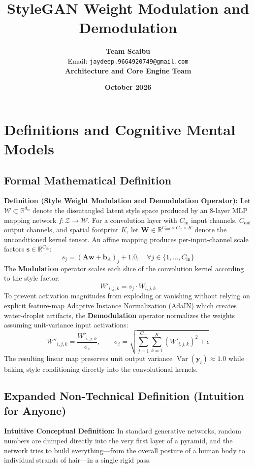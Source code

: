 \documentclass[11pt,a4paper]{article}
\title{\textbf{StyleGAN Weight Modulation and Demodulation}}
\author{\textbf{Team Scaibu} \\ \small Email: \texttt{jaydeep.9664920749@gmail.com} \\ \small \textbf{Architecture and Core Engine Team}}
\date{\textbf{October 2026}}
\theoremstyle{definition}
\begin{document}
\maketitle

\section{Definitions and Cognitive Mental Models}

\subsection{Formal Mathematical Definition}
\textbf{Definition (Style Weight Modulation and Demodulation Operator):}
Let $\mathcal{W} \subset \mathbb{R}^{d_w}$ denote the disentangled latent style space produced by an 8-layer MLP mapping network $f: \mathcal{Z} \to \mathcal{W}$. For a convolution layer with $C_{\text{in}}$ input channels, $C_{\text{out}}$ output channels, and spatial footprint $K$, let $\mathbf{W} \in \mathbb{R}^{C_{\text{out}} \times C_{\text{in}} \times K}$ denote the unconditioned kernel tensor. An affine mapping produces per-input-channel scale factors $\mathbf{s} \in \mathbb{R}^{C_{\text{in}}}$:
{\boldmath
\begin{equation}
s_j = \left( \mathbf{A} \mathbf{w} + \mathbf{b}_A \right)_j + 1.0, \quad \forall j \in \{1, \dots, C_{\text{in}}\}
\end{equation}
}
The \textbf{Modulation} operator scales each slice of the convolution kernel according to the style factor:
{\boldmath
\begin{equation}
W'_{i, j, k} = s_j \cdot W_{i, j, k}
\end{equation}
}
To prevent activation magnitudes from exploding or vanishing without relying on explicit feature-map Adaptive Instance Normalization (AdaIN) which creates water-droplet artifacts, the \textbf{Demodulation} operator normalizes the weights assuming unit-variance input activations:
{\boldmath
\begin{equation}
W''_{i, j, k} = \frac{W'_{i, j, k}}{\sigma_i}, \qquad \sigma_i = \sqrt{\sum_{j=1}^{C_{\text{in}}} \sum_{k=1}^K (W'_{i, j, k})^2 + \epsilon}
\end{equation}
}
The resulting linear map preserves unit output variance $\operatorname{Var}(\mathbf{y}_i) \approx 1.0$ while baking style conditioning directly into the convolutional kernels.

\subsection{Expanded Non-Technical Definition (Intuition for Anyone)}
\textbf{Intuitive Conceptual Definition:}
In standard generative networks, random numbers are dumped directly into the very first layer of a pyramid, and the network tries to build everything—from the overall posture of a human body to individual strands of hair—in a single rigid pass.
\end{document}
